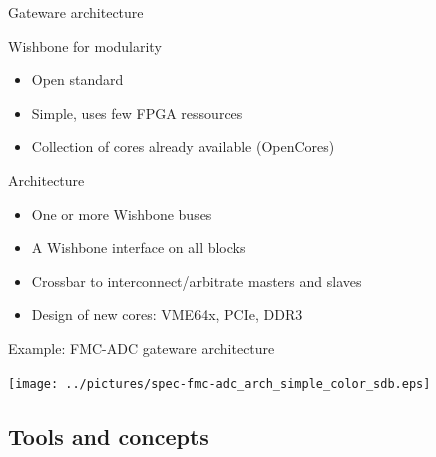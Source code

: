 \documentclass[compress,red]{beamer}
\begin{document}
\begin{frame}{Gateware architecture}

  \begin{block}{Wishbone for modularity}
    \begin{itemize}
    \item Open standard
    \item Simple, uses few FPGA ressources
    \item Collection of cores already available (OpenCores)
    \end{itemize}
  \end{block}

  \begin{block}{Architecture}
    \begin{itemize}
    \item One or more Wishbone buses
    \item A Wishbone interface on all blocks
    \item Crossbar to interconnect/arbitrate masters and slaves %
    \item Design of new cores: VME64x, PCIe, DDR3
    \end{itemize}
  \end{block}

  \note[item]{}

\end{frame}

\begin{frame}{Example: FMC-ADC gateware architecture}

  \begin{center}
    \texttt{[image: ../pictures/spec-fmc-adc\_arch\_simple\_color\_sdb.eps]}
  \end{center}

  \note[item]{}

\end{frame}

\subsection{Tools and concepts}
\end{document}
